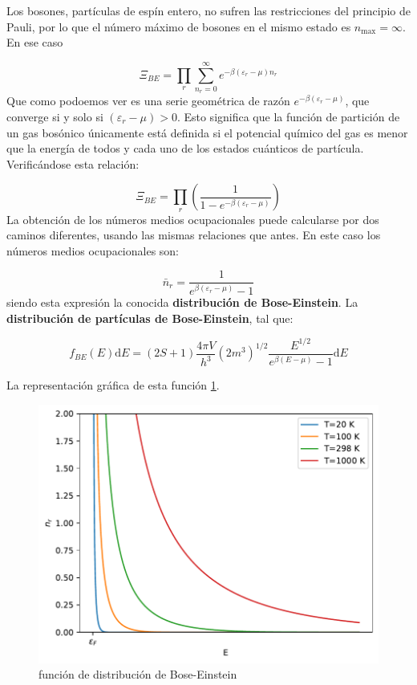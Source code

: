 \documentclass[12pt,a4paper]{article}
\numberwithin{equation}{section}
\numberwithin{figure}{section}
\newcommand{\parentesis}[1]{\left( #1  \right)}
\newcommand{\D}{\mathrm{d}}
\theoremstyle{definition}
\begin{document}
Los bosones, partículas de espín entero, no sufren las restricciones del principio de Pauli, por lo que el número máximo de bosones en el mismo estado es $n_{\max} = \infty$. En ese caso 

\begin{equation}
\Xi_{BE} = \prod_r \sum_{n_r=0}^\infty e^{-\beta (\varepsilon_r - \mu ) n_r}
\end{equation}
Que como podoemos ver es una serie geométrica de razón $e^{-\beta (\varepsilon_r-\mu)}$, que converge si y solo si $(\varepsilon_r - \mu)>0$. Esto significa que la función de partición de un gas bosónico únicamente está definida si el potencial químico del gas es menor que la energía de todos y cada uno de los estados cuánticos de partícula. Verificándose esta relación:

\begin{equation}
\Xi_{BE} = \prod_r \parentesis{\frac{1}{1-e^{-\beta (\varepsilon_r - \mu)}}}
\end{equation}
La obtención de los números medios ocupacionales puede calcularse por dos caminos diferentes, usando las mismas relaciones que antes. En este caso los números medios ocupacionales son:

\begin{equation}
\bar{n}_r = \frac{1}{e^{\beta (\varepsilon_r - \mu)} - 1}
\end{equation}
siendo esta expresión la conocida \textbf{distribución de Bose-Einstein}. La \textbf{distribución de partículas de Bose-Einstein}, tal que:

\begin{equation}
f_{BE}(E) \D E = (2S +1 ) \frac{4 \pi V}{h^3} (2m^3)^{1/2} \frac{E^{1/2}}{e^{\beta(E-\mu)}-1} \D E
\end{equation}

La representación gráfica de esta función \ref{Fig:3.2.02}.

\begin{figure}[h!]\centering
    \includegraphics[scale=0.9]{03-Bose-Einstein.pdf}
    \caption[short]{función de distribución de Bose-Einstein}
    \label{Fig:3.2.02}
\end{figure}
\end{document}
